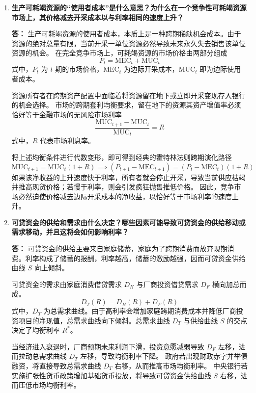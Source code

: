 \begin{enumerate}[label=\textbf{\arabic*.}, leftmargin=*]
		跨期总成本现值的计算能够帮助消费者在不同效能的家电之间做出理性的成本最小化选择。
		不同消费者的主观贴现率 $R$ 的差异，会导致最终选优决策的分化。
		
		对于面临流动性约束、借贷成本高昂的低收入消费者，其主观贴现率 $R$ 极高，这会极大地压缩未来能耗成本在总现值中的权重。
		高贴现率引发的数理结果是，他们更倾向于选择初始售价 $C_i$ 较低但高能耗的低效能家电。
		反之，资金充裕的消费者贴现率较低，更倾向于支付高额的初始成本以换取长期的低运营开支。
		
		\item \textbf{生产可耗竭资源的“使用者成本”是什么意思？为什么在一个竞争性可耗竭资源市场上，其价格减去开采成本以与利率相同的速度上升？}
		
		\textbf{答：}
		生产可耗竭资源的使用者成本，本质上是一种跨期稀缺机会成本。由于资源的绝对总量有限，当前开采一单位资源必然导致未来永久失去销售该单位资源的机会。
		在完全竞争市场上，可耗竭资源的市场价格由两部分组成
		\[
		P_t = \text{MEC}_t + \text{MUC}_t
		\]
		式中，$P_t$ 为 $t$ 期的市场价格，$\text{MEC}_t$ 为边际开采成本，$\text{MUC}_t$ 即为边际使用者成本。
		
		资源所有者在跨期资产配置中面临着将资源留在地下或立即开采变现存入银行的机会选择。
		市场的跨期套利均衡要求，留在地下的资源其资产增值率必须恰好等于金融市场的无风险市场利率
		\[
		\frac{\text{MUC}_{t+1} - \text{MUC}_t}{\text{MUC}_t} = R
		\]
		式中，$R$ 代表市场利息率。
		
		将上述均衡条件进行代数变形，即可得到经典的霍特林法则跨期演化路径
		\[
		\text{MUC}_{t+1} = \text{MUC}_t (1+R) \implies (P_{t+1} - \text{MEC}_{t+1}) = (P_t - \text{MEC}_t)(1+R)
		\]
		如果该净收益的上升速度快于利率，所有者就会停止开采，导致当前供应枯竭并推高现货价格；若慢于利率，则会引发疯狂抛售推低价格。
		因此，竞争市场必然迫使价格减去边际开采成本的净收益，以恰好等于市场利率的速度上升。
		\item \textbf{可贷资金的供给和需求由什么决定？哪些因素可能导致可贷资金的供给移动或需求移动，并且这将会如何影响利率？}
		
		\textbf{答：}
		可贷资金的供给主要来自家庭储蓄，家庭为了跨期消费而放弃现期消费。利率构成了储蓄的报酬，利率越高，储蓄的激励越强，因而可贷资金供给曲线 $S$ 向上倾斜。
		
		可贷资金的需求由家庭消费借贷需求 $D_H$ 与厂商投资借贷需求 $D_F$ 横向加总而成。
		\[
		D_T(R) = D_H(R) + D_F(R)
		\]
		式中，$D_T$ 为总需求曲线。由于高利率会增加家庭跨期消费成本并降低厂商投资项目的净现值，总需求曲线向下倾斜。总需求曲线 $D_T$ 与供给曲线 $S$ 的交点决定了均衡利率 $R^*$。
		
		当经济进入衰退时，厂商预期未来利润下滑，投资意愿减弱导致 $D_F$ 左移，进而拉动总需求曲线 $D_T$ 左移，导致均衡利率下降。
		政府若出现财政赤字并举债融资，将直接导致总需求曲线 $D_T$ 右移，从而推高市场均衡利率。
		中央银行若实施扩张性货币政策增加基础货币投放，将导致可贷资金供给曲线 $S$ 右移，进而压低市场均衡利率。
		

\end{enumerate}
